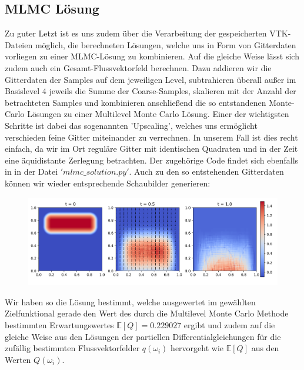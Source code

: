 \subsection{MLMC Lösung}
Zu guter Letzt ist es uns zudem über die Verarbeitung der gespeicherten VTK-Dateien möglich, die berechneten Lösungen, welche uns in Form von Gitterdaten vorliegen zu einer MLMC-Lösung zu kombinieren. Auf die gleiche Weise lässt sich zudem auch ein Gesamt-Flussvektorfeld berechnen. Dazu addieren wir die Gitterdaten der Samples auf dem jeweiligen Level, subtrahieren überall außer im Basislevel $ 4 $ jeweils die Summe der Coarse-Samples, skalieren mit der Anzahl der betrachteten Samples und kombinieren anschließend die so entstandenen Monte-Carlo Lösungen zu einer Multilevel Monte Carlo Lösung.
Einer der wichtigsten Schritte ist dabei das sogenannten 'Upscaling', welches uns ermöglicht verschieden feine Gitter miteinander zu verrechnen. In unserem Fall ist dies recht einfach, da wir im Ort reguläre Gitter mit identischen Quadraten und in der Zeit eine äquidistante Zerlegung betrachten. Der zugehörige Code findet sich ebenfalls in \cite{githubvtk} in der Datei $'mlmc\_solution.py'$.
Auch zu den so entstehenden Gitterdaten können wir wieder entsprechende Schaubilder generieren:
\begin{figure}[H]
	\centering
	\includegraphics[width=\textwidth]{plots/mlmc.png} 
\end{figure}
Wir haben so die Lösung bestimmt, welche ausgewertet im gewählten Zielfunktional gerade den Wert des durch die Multilevel Monte Carlo Methode bestimmten Erwartungswertes
$ \mathbb{E}[Q] = 0.229027 $ ergibt und zudem auf die gleiche Weise aus den Lösungen der partiellen Differentialgleichungen für die zufällig bestimmten Flussvektorfelder $ q(\omega_i) $ hervorgeht wie $ \mathbb{E}[Q] $ aus den Werten $ Q(\omega_i) $.

